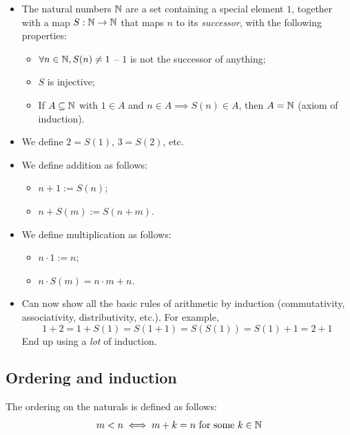\documentclass{../template/note}
\begin{document}
    \begin{itemize}
        \item The natural numbers \(\mathbb N\) are a set containing a special element \(1\), together with a map \(S: \mathbb N \to \mathbb N\) that maps \(n\) to its \emph{successor}, with the following properties:
        \begin{itemize}
            \item \(\forall n \in \mathbb N, S(n) \neq 1\) -- 1 is not the successor of anything;
            \item \(S\) is injective;
            \item If \(A \subseteq \mathbb N\) with \(1 \in A\) and \(n \in A \implies S(n) \in A\), then \(A = \mathbb N\) (axiom of induction).
        \end{itemize}
        \item We define \(2 = S(1)\), \(3 = S(2)\), etc.
        \item We define addition as follows:
        \begin{itemize}
            \item \(n+1 := S(n)\);
            \item \(n+S(m) := S(n+m)\).
        \end{itemize}
        \item We define multiplication as follows:
        \begin{itemize}
            \item \(n \cdot 1 := n\);
            \item \(n \cdot S(m) = n \cdot m + n\).
        \end{itemize}
        \item Can now show all the basic rules of arithmetic by induction (commutativity, associativity, distributivity, etc.). For example,
        \[
            1 + 2 = 1 + S(1) = S(1 + 1) = S(S(1)) = S(1) + 1 = 2 + 1
        \]
        End up using a \emph{lot} of induction.
        
        
        
        
    \end{itemize}
    

    \subsection{Ordering and induction}

    \begin{definition}[Ordering]
        The ordering on the naturals is defined as follows:
        \[  
            m < n \iff m + k = n \text{ for some } k \in \mathbb N
        \]
    \end{definition}
    
\end{document}
